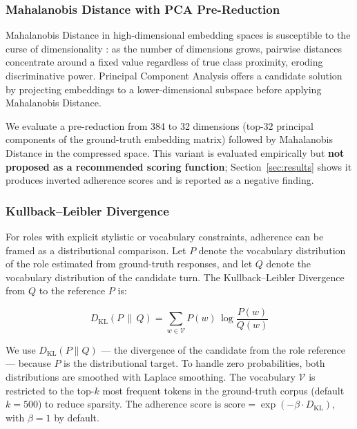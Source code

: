 \documentclass[11pt,a4paper]{article}
\begin{document}
\subsubsection{Mahalanobis Distance with PCA Pre-Reduction}
\label{sec:pca_mahal}

Mahalanobis Distance in high-dimensional embedding spaces is susceptible to
the curse of dimensionality \citep{beyer1999nearest}: as the number of
dimensions grows, pairwise distances concentrate around a fixed value
regardless of true class proximity, eroding discriminative power. Principal
Component Analysis \citep{jolliffe2002pca} offers a candidate solution by
projecting embeddings to a lower-dimensional subspace before applying
Mahalanobis Distance.

We evaluate a pre-reduction from 384 to 32 dimensions (top-32 principal
components of the ground-truth embedding matrix) followed by Mahalanobis
Distance in the compressed space. This variant is evaluated empirically but
\textbf{not proposed as a recommended scoring function}; Section~\ref{sec:results}
shows it produces inverted adherence scores and is reported as a negative
finding.

\subsubsection{Kullback--Leibler Divergence}

For roles with explicit stylistic or vocabulary constraints, adherence can be
framed as a distributional comparison. Let $P$ denote the vocabulary
distribution of the role estimated from ground-truth responses, and let $Q$
denote the vocabulary distribution of the candidate turn. The
Kullback--Leibler Divergence \citep{kullback1951information} from $Q$ to the
reference $P$ is:

\begin{equation}
  D_{\mathrm{KL}}(P \,\|\, Q) =
  \sum_{w \in \mathcal{V}} P(w)\, \log \frac{P(w)}{Q(w)}
  \label{eq:kl}
\end{equation}

We use $D_{\mathrm{KL}}(P \| Q)$ --- the divergence of the candidate from
the role reference --- because $P$ is the distributional target. To handle
zero probabilities, both distributions are smoothed with Laplace smoothing.
The vocabulary $\mathcal{V}$ is restricted to the top-$k$ most frequent
tokens in the ground-truth corpus (default $k = 500$) to reduce sparsity.
The adherence score is $\text{score} = \exp(-\beta \cdot D_{\mathrm{KL}})$,
with $\beta = 1$ by default.
\end{document}
